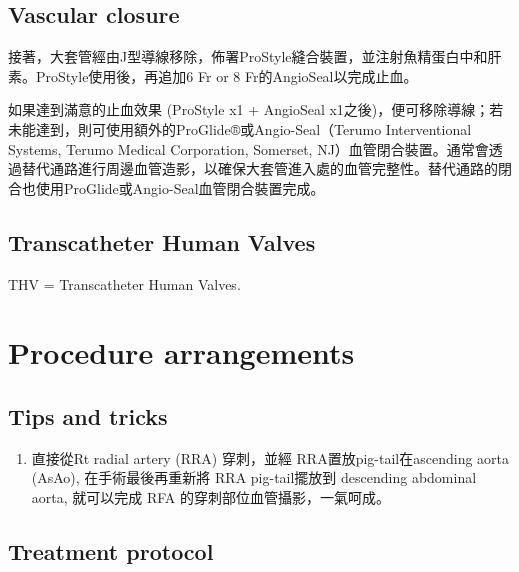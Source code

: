 \documentclass[nols]{tufte-book}
\begin{document}
\subsection{Vascular closure}

接著，大套管經由J型導線移除，佈署ProStyle縫合裝置，並注射魚精蛋白中和肝素。ProStyle使用後，再追加6 Fr or 8 Fr的AngioSeal以完成止血。

如果達到滿意的止血效果 (ProStyle x1 + AngioSeal x1之後)，便可移除導線；若未能達到，則可使用額外的ProGlide®或Angio-Seal（Terumo Interventional Systems, Terumo Medical Corporation, Somerset, NJ）血管閉合裝置。通常會透過替代通路進行周邊血管造影，以確保大套管進入處的血管完整性。替代通路的閉合也使用ProGlide或Angio-Seal血管閉合裝置完成。

\subsection{Transcatheter Human Valves}
THV = Transcatheter Human Valves.


\section{Procedure arrangements}
\subsection{Tips and tricks}
\begin{enumerate}
    \item 直接從Rt radial artery (RRA) 穿刺，並經 RRA置放pig-tail在ascending aorta (AsAo), 在手術最後再重新將 RRA pig-tail擺放到 descending abdominal aorta, 就可以完成 RFA 的穿刺部位血管攝影，一氣呵成。
\end{enumerate}

\subsection{Treatment protocol}
\end{document}
